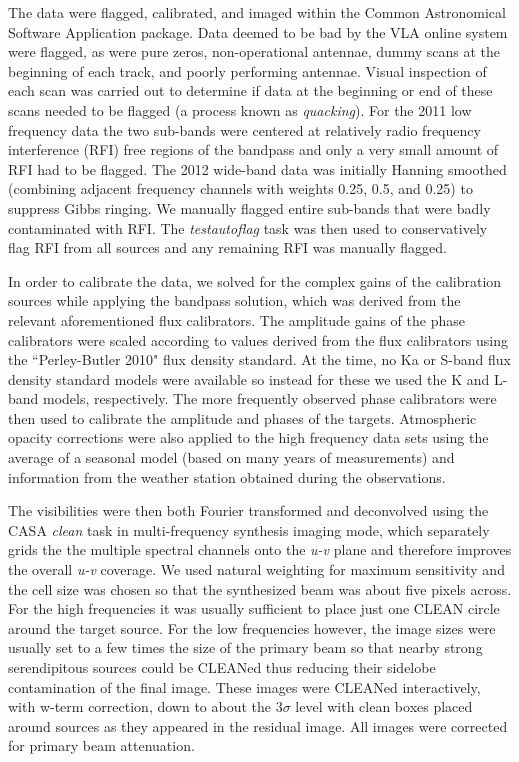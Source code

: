 \documentclass[iop]{emulateapj}
\begin{document}
The data were flagged, calibrated, and imaged within the Common Astronomical Software Application  \cite[CASA;][]{2007ASPC..376..127M} package. Data deemed to be bad by the VLA online system were flagged, as were pure zeros, non-operational antennae, dummy scans at the beginning of each track, and poorly performing antennae. Visual inspection of each scan was carried out to determine if data at the beginning or end of these scans needed to be flagged (a process known as \textit{quacking}). For the 2011 low frequency data the two sub-bands were centered at relatively radio frequency interference (RFI) free regions of the bandpass and only a very small amount of RFI had to be flagged.   The 2012 wide-band data was initially Hanning smoothed (combining adjacent frequency channels with weights 0.25, 0.5, and 0.25) to suppress Gibbs ringing. We manually flagged entire sub-bands that were badly contaminated with RFI. The \textit{testautoflag} task was then used to conservatively flag RFI from all sources and any remaining RFI was manually flagged. 

In order to calibrate the data, we solved for the complex gains of the calibration sources while applying the bandpass solution, which was derived from the relevant aforementioned flux calibrators.  The amplitude gains of the phase calibrators were scaled according to values derived from the flux calibrators using the ``Perley-Butler 2010" flux density standard. At the time, no Ka or S-band flux density standard models were available so instead for these we used the K and L-band models, respectively. The more frequently observed phase calibrators were then used to calibrate the amplitude and phases of the targets. Atmospheric opacity corrections were also applied to the high frequency data sets using the average of a seasonal model (based on many years of measurements) and information from the weather station obtained during the observations.

The visibilities were then both Fourier transformed and deconvolved using the CASA \textit{clean} task in multi-frequency synthesis imaging mode, which separately grids the the multiple spectral channels onto the \textit{u-v} plane and therefore improves the overall \textit{u-v} coverage. We used natural weighting for maximum sensitivity and the cell size was chosen so that the synthesized beam was about five pixels across. For the high frequencies it was usually sufficient to place just one CLEAN circle around the target source.  For the low frequencies however, the image sizes were usually set to a few times the size of the primary beam so that nearby strong serendipitous sources could be CLEANed thus reducing their sidelobe contamination of the final image. These images were CLEANed interactively, with w-term correction, down to about the $3\sigma$  level with clean boxes placed around sources as they appeared in the residual image. All images were corrected for  primary beam attenuation. 
\end{document}
